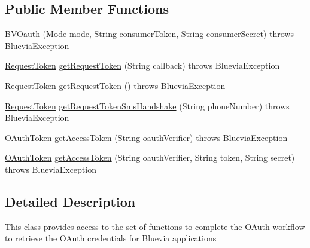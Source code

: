 \subsection*{Public Member Functions}
\begin{DoxyCompactItemize}
\item 
\hyperlink{classcom_1_1bluevia_1_1oauth_1_1client_1_1BVOauth_aebbab9a6126885108237b8ab706af15f}{BVOauth} (\hyperlink{classcom_1_1bluevia_1_1commons_1_1client_1_1BVBaseClient_a5f4a4a27d73a8ddd0ce450a6c7a4d1b7}{Mode} mode, String consumerToken, String consumerSecret)  throws BlueviaException 
\item 
\hyperlink{classcom_1_1bluevia_1_1commons_1_1connector_1_1http_1_1oauth_1_1RequestToken}{RequestToken} \hyperlink{classcom_1_1bluevia_1_1oauth_1_1client_1_1BVOauth_a44e719ff1c39463036f3f4a27ccf235a}{getRequestToken} (String callback)  throws BlueviaException 
\item 
\hyperlink{classcom_1_1bluevia_1_1commons_1_1connector_1_1http_1_1oauth_1_1RequestToken}{RequestToken} \hyperlink{classcom_1_1bluevia_1_1oauth_1_1client_1_1BVOauth_ade519920fd49023170b97938c1ff2d4e}{getRequestToken} ()  throws BlueviaException 
\item 
\hyperlink{classcom_1_1bluevia_1_1commons_1_1connector_1_1http_1_1oauth_1_1RequestToken}{RequestToken} \hyperlink{classcom_1_1bluevia_1_1oauth_1_1client_1_1BVOauth_aaf60f095a181cf17396b43c735565d34}{getRequestTokenSmsHandshake} (String phoneNumber)  throws BlueviaException 
\item 
\hyperlink{classcom_1_1bluevia_1_1commons_1_1connector_1_1http_1_1oauth_1_1OAuthToken}{OAuthToken} \hyperlink{classcom_1_1bluevia_1_1oauth_1_1client_1_1BVOauth_a6f083c5cae0b88e3baa822867db60362}{getAccessToken} (String oauthVerifier)  throws BlueviaException 
\item 
\hyperlink{classcom_1_1bluevia_1_1commons_1_1connector_1_1http_1_1oauth_1_1OAuthToken}{OAuthToken} \hyperlink{classcom_1_1bluevia_1_1oauth_1_1client_1_1BVOauth_a8d2990a0d62918c320bbf37abc6fb520}{getAccessToken} (String oauthVerifier, String token, String secret)  throws BlueviaException 
\end{DoxyCompactItemize}


\subsection{Detailed Description}
This class provides access to the set of functions to complete the OAuth workflow to retrieve the OAuth credentials for Bluevia applications

